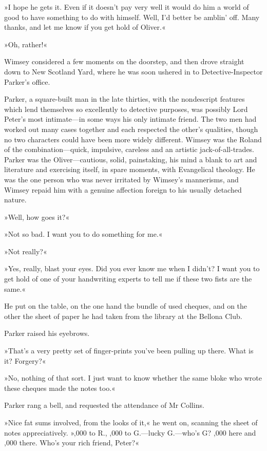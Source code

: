 »I hope he gets it. Even if it doesn't pay very well it would do him a world of good to have something to do with himself. Well, I'd better be amblin' off. Many thanks, and let me know if you get hold of Oliver.«

»Oh, rather!«

Wimsey considered a few moments on the doorstep, and then drove straight down to New Scotland Yard, where he was soon ushered in to Detective-Inspector Parker's office.

Parker, a square-built man in the late thirties, with the nondescript features which lend themselves so excellently to detective purposes, was possibly Lord Peter's most intimate\allowbreak---\allowbreak in some ways his only intimate friend. The two men had worked out many cases together and each respected the other's qualities, though no two characters could have been more widely different. Wimsey was the Roland of the combination\allowbreak---\allowbreak quick, impulsive, careless and an artistic jack-of-all-trades. Parker was the Oliver\allowbreak---\allowbreak cautious, solid, painstaking, his mind a blank to art and literature and exercising itself, in spare moments, with Evangelical theology. He was the one person who was never irritated by Wimsey's mannerisms, and Wimsey repaid him with a genuine affection foreign to his usually detached nature.

»Well, how goes it?«

»Not so bad. I want you to do something for me.«

»Not really?«

»Yes, really, blast your eyes. Did you ever know me when I didn't? I want you to get hold of one of your handwriting experts to tell me if these two fists are the same.«

He put on the table, on the one hand the bundle of used cheques, and on the other the sheet of paper he had taken from the library at the Bellona Club.

Parker raised his eyebrows.

»That's a very pretty set of finger-prints you've been pulling up there. What is it? Forgery?«

»No, nothing of that sort. I just want to know whether the same bloke who wrote these cheques made the notes too.«

Parker rang a bell, and requested the attendance of Mr Collins.

»Nice fat sums involved, from the looks of it,« he went on, scanning the sheet of notes appreciatively. »,000 to R., ,000 to G.---lucky G.---who's G? ,000 here and ,000 there. Who's your rich friend, Peter?«

